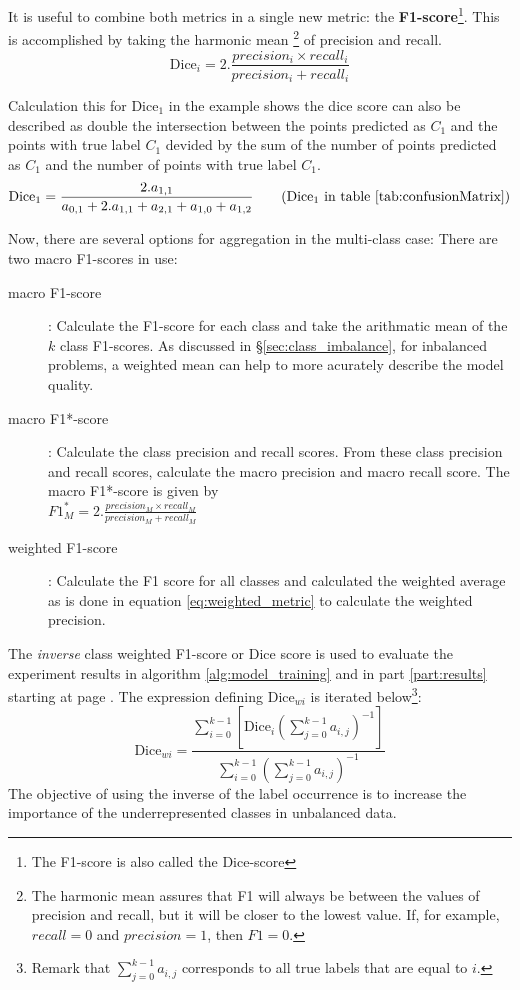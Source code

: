 \par{It is useful to combine both metrics in a single new metric: the \textbf{F1-score}\footnote{The F1-score is also called the Dice-score}. This is accomplished by taking the harmonic mean
\footnote{The harmonic mean assures that F1 will always be between the values of precision and recall, but it will be closer to the lowest value. If, for example, $recall=0$ and $precision=1$, then $F1=0$.} of precision and recall.
\begin{equation}
    \text{Dice}_i = 2 . \frac{precision_i \times recall_i }{precision_i + recall_i }
\end{equation}
}
\par{
    Calculation this for Dice$_1$ in the example shows the dice score can also be described as double the intersection 
    between the points predicted as $C_1$ and the points with true label $C_1$ devided by the sum of the number of points predicted as $C_1$ and the number of points with true label $C_1$.
    \begin{equation}
        \text{Dice}_1 = \frac{2.a_{1,1}}{a_{0,1} + 2.a_{1,1} + a_{2, 1} + a_{1,0} + a_{1,2}} \tag{Dice$_1$ in table \ref{tab:confusionMatrix}}
    \end{equation}
}
\par{
    Now, there are several options for aggregation in the multi-class case:
    There are two macro F1-scores in use:
    \begin{description}
        \item[macro F1-score]: Calculate the F1-score for each class and take the arithmatic mean of the $k$ class F1-scores. As discussed in §\ref{sec:class_imbalance}, for inbalanced problems, a weighted mean can help to more acurately describe the model quality.
        \item[macro F1*-score]: Calculate the class precision and recall scores. From these class precision and recall scores, calculate the macro precision and macro recall score. 
        The macro F1*-score is given by\\ $F1_M^*=2 . \frac{precision_M \times recall_M }{precision_M + recall_M }$
        \item[weighted F1-score]: Calculate the F1 score for all classes and calculated the weighted average as is done in equation \ref{eq:weighted_metric} to calculate the weighted precision.
    \end{description}
}
The \textit{inverse} class weighted F1-score or Dice score is used to evaluate the experiment results in algorithm \ref{alg:model_training} and in part \ref{part:results} starting at page \pageref{part:results}.
The expression defining $\text{Dice}_{wi}$ is iterated below\footnote{Remark that $\sum_{j=0}^{k-1} a_{i,j}$ corresponds to all true labels that are equal to $i$.}:
\begin{equation}
    \text{Dice}_{wi} = \frac{\sum_{i=0}^{k-1} \left[ \text{Dice}_i \left( \sum_{j=0}^{k-1} a_{i,j} \right)^{-1} \right] }{\sum_{i=0}^{k-1} \left(\sum_{j=0}^{k-1} a_{i,j} \right)^{-1}} \label{eq:weighted_dice}
\end{equation}
The objective of using the inverse of the label occurrence is to increase the importance of the underrepresented classes in unbalanced data.

